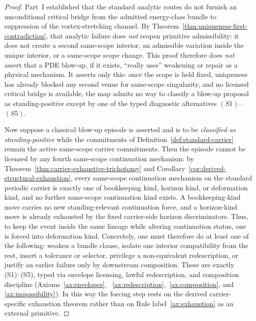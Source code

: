 \begin{proof}
Part~I established that the standard analytic routes do not furnish an unconditional critical bridge
from the admitted energy-class bundle to suppression of the vortex-stretching channel. By
Theorem~\ref{thm:uniqueness-first-contradiction}, that analytic failure does \emph{not} reopen primitive admissibility: it does not create a second same-scope interior, an admissible variation inside the unique interior, or a same-scope scope change. This proof therefore does \emph{not} assert that a PDE blow-up, if it exists, ``really uses'' weakening or repair as a physical mechanism. It asserts only this: once the scope is held fixed, uniqueness has already blocked any second venue for same-scope singularity, and no licensed critical bridge is available, the map admits no way to classify a blow-up proposal as standing-positive except by one of the typed diagnostic alternatives $(S1)$--$(S5)$.

Now suppose a classical blow-up episode is asserted and is to be \emph{classified as standing-positive}
while the commitments of Definition~\ref{def:standard-carrier} remain the active same-scope carrier
commitments.
Then the episode cannot be licensed by any fourth same-scope continuation mechanism: by
Theorem~\ref{thm:carrier-exhaustive-trichotomy} and Corollary~\ref{cor:derived-structural-exhaustion},
every same-scope continuation mechanism on the standard periodic carrier is exactly one of
bookkeeping kind, horizon kind, or deformation kind, and no further same-scope continuation kind exists.
A bookkeeping-kind move carries no new standing-relevant continuation force, and a horizon-kind move is
already exhausted by the fixed carrier-side horizon discriminators. Thus, to keep the event inside the
same lineage while altering continuation status, one is forced into deformation kind. Concretely, one
must therefore do at least one of the following: weaken a bundle clause, isolate one interior
compatibility from the rest, insert a tolerance or selector, privilege a non-equivalent redescription,
or justify an earlier failure only by downstream composition. These are exactly (S1)--(S5), typed via
envelope licensing, lawful redescription, and composition discipline (Axioms~\ref{ax:envelopes},
~\ref{ax:redescription},~\ref{ax:composition}, and \ref{ax:impossibility}). In this way the forcing
step rests on the derived carrier-specific exhaustion theorem rather than on Rule label~\ref{ax:exhaustion}
as an external primitive.
\end{proof}

